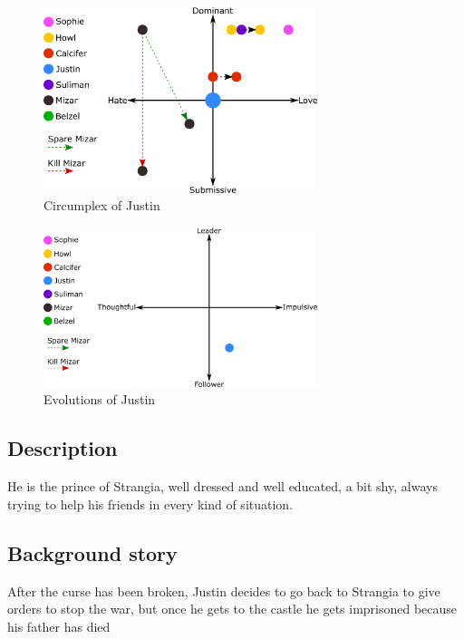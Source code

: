 \begin{figure}
  \centering
  \includegraphics[width=8cm]{Images/Circumplexes/justinCircumplex}
  \caption{Circumplex of Justin}
\end{figure}

\begin{figure}
  \centering
   \includegraphics[width=8cm]{Images/Evolutions/justinEvolution}
  \caption{Evolutions of Justin}
\end{figure}

\subsection{Description}
He is the prince of Strangia, well dressed and well educated, a bit shy, always trying to help his friends in every kind of situation.

\subsection{Background story}
 After the curse has been broken, Justin decides to go back to Strangia to give orders to stop the war, but once he gets to the castle he gets imprisoned because his father has died



